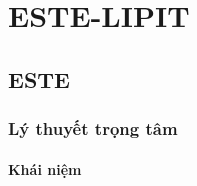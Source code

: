 \fancyhead[RO,LE]{\color{\mycolor}{\Large\fmmfamily\itshape Chương 1.ESTE - LIPIT}}
\chapter{ESTE-LIPIT}
\section{ESTE}
\subsection{Lý thuyết trọng tâm}
\subsubsection{Khái niệm}

